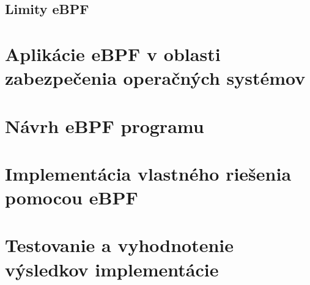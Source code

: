 \subsection{Limity eBPF}
\section{Aplikácie eBPF v oblasti zabezpečenia operačných systémov}
\section{Návrh eBPF programu}
\section{Implementácia vlastného riešenia pomocou eBPF}
\section{Testovanie a vyhodnotenie výsledkov implementácie}














